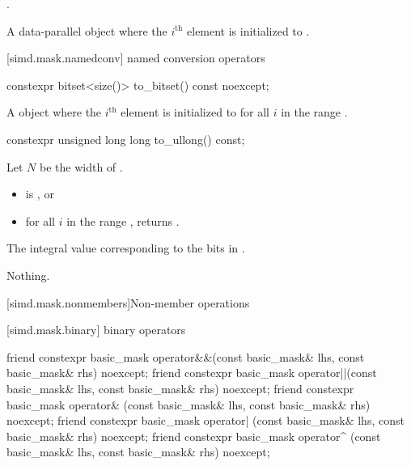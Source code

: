 \begin{itemdescr}
\pnum
\constraints
{}.

\pnum
\returns
A data-parallel object where the $i^\text{th}$ element is initialized to
.
\end{itemdescr}

[simd.mask.namedconv]{ named conversion operators}

\begin{itemdecl}
constexpr bitset<size()> to_bitset() const noexcept;
\end{itemdecl}

\begin{itemdescr}
\pnum
\returns
A  object where the $i^\text{th}$ element is initialized to
 for all $i$ in the range .
\end{itemdescr}

\begin{itemdecl}
constexpr unsigned long long to_ullong() const;
\end{itemdecl}

\begin{itemdescr}
\pnum
Let $N$ be the width of .

\pnum
\expects
\begin{itemize}
\item {} is , or
\item for all $i$ in the range ,  returns .
\end{itemize}

\pnum
\returns
The integral value corresponding to the bits in .

\pnum
\throws
Nothing.
\end{itemdescr}

[simd.mask.nonmembers]{Non-member operations}

[simd.mask.binary]{ binary operators}

\begin{itemdecl}
friend constexpr basic_mask
  operator&&(const basic_mask& lhs, const basic_mask& rhs) noexcept;
friend constexpr basic_mask
  operator||(const basic_mask& lhs, const basic_mask& rhs) noexcept;
friend constexpr basic_mask
  operator& (const basic_mask& lhs, const basic_mask& rhs) noexcept;
friend constexpr basic_mask
  operator| (const basic_mask& lhs, const basic_mask& rhs) noexcept;
friend constexpr basic_mask
  operator^ (const basic_mask& lhs, const basic_mask& rhs) noexcept;
\end{itemdecl}


